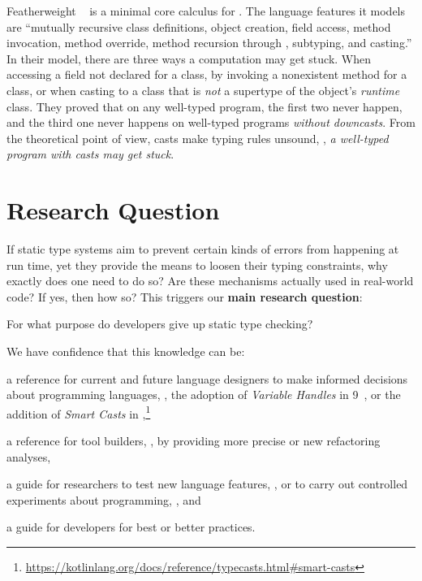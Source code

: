 Featherweight \java{}~\citep{igarashiFeatherweightJavaMinimal2001} is a minimal core calculus for \java{}.
The language features it models are ``mutually recursive class definitions,
object creation, field access, method invocation, method override, method recursion through , subtyping, and casting.''
In their model, there are three ways a computation may get stuck.
When accessing a field not declared for a class,
by invoking a nonexistent method for a class,
or when casting to a class that is \emph{not} a supertype of the object's \emph{runtime} class.
They proved that on any well-typed program, the first two never happen,
and the third one never happens on well-typed programs \emph{without downcasts}.
From the theoretical point of view, casts make typing rules unsound, \ie{},
\emph{a well-typed program with casts may get stuck}.

\section{Research Question}

If static type systems aim to prevent certain kinds of errors from happening at run time,
yet they provide the means to loosen their typing constraints,
why exactly does one need to do so?
Are these mechanisms actually used in real-world code?
If yes, then how so?
This triggers our \textbf{main research question}:

\begin{mdframed}

\centering
For what purpose do developers give up static type checking?
\end{mdframed}

We have confidence that this knowledge can be:
\begin{inparaenum}[a)]
\item a reference for current and future language designers
to make informed decisions about programming languages,
\eg{}, the adoption of \emph{Variable Handles} in \java{} 9~\citep{jep193},
or the addition of \emph{Smart Casts} in ,\footnote{\url{https://kotlinlang.org/docs/reference/typecasts.html\#smart-casts}}
\item a reference for tool builders, \eg{}, by providing more precise or new refactoring analyses,
\item a guide for researchers to test new language features, \eg{}, \cite{wintherGuardedTypePromotion2011} or to carry out controlled experiments about programming, \eg{}, \cite{stuchlikStaticVsDynamic2011} and
\item a guide for developers for best or better practices.
\end{inparaenum}

